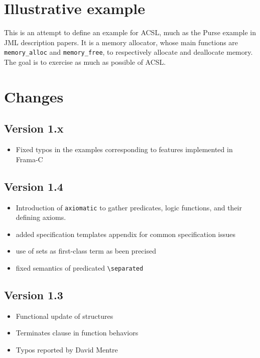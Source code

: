 \documentclass[a4paper,11pt,twoside,openright]{report}
\begin{document}






\section{Illustrative example}

This is an attempt to define an example for ACSL, much as the Purse
example in JML description papers.  It is a memory allocator, whose
main functions are \verb|memory_alloc| and \verb|memory_free|, to
respectively allocate and deallocate memory.  The goal is to exercise
as much as possible of ACSL.



\section{Changes}

\subsection{Version 1.x}
\begin{itemize}
\item Fixed typos in the examples corresponding to features
  implemented in Frama-C
\end{itemize}

\subsection{Version 1.4}
\begin{itemize}
\item Introduction of \verb|axiomatic| to gather predicates, logic
  functions, and their defining axioms.
\item added specification templates appendix for common specification issues
\item use of sets as first-class term as been precised
\item fixed semantics of predicated \verb|\separated|
\end{itemize}

\subsection{Version 1.3}
\begin{itemize}
\item Functional update of structures
\item Terminates clause in function behaviors
\item Typos reported by David Mentre

\end{itemize}
\end{document}
